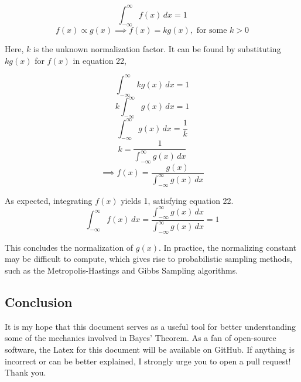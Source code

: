 \documentclass[12pt]{article}
\begin{document}
\begin{equation}
\int_{-\infty}^{\infty} f(x) \, dx = 1
\end{equation}
\begin{equation}
f(x) \propto g(x) \implies f(x) = k g(x), \text{ for some } k > 0
\end{equation}

\noindent Here, $k$ is the unknown normalization factor. It can be found by substituting $kg(x)$ for $f(x)$ in equation 22,

\begin{equation}
\int_{-\infty}^{\infty} kg(x) \, dx = 1
\end{equation}
\begin{equation}
k\int_{-\infty}^{\infty} g(x) \, dx = 1
\end{equation}
\begin{equation}
\int_{-\infty}^{\infty} g(x) \, dx = \frac{1}{k}
\end{equation}
\begin{equation}
k = \frac{1}{\int_{-\infty}^{\infty} g(x) \, dx}
\end{equation}
\begin{equation}
\implies f(x) = \frac{g(x)}{\int_{-\infty}^{\infty} g(x) \, dx}
\end{equation}

\noindent As expected, integrating $f(x)$ yields 1, satisfying equation 22.
\begin{equation}
\int_{-\infty}^{\infty} f(x)\, dx = \frac{\int_{-\infty}^{\infty} g(x) \, dx}{\int_{-\infty}^{\infty} g(x) \, dx} = 1
\end{equation}

\noindent This concludes the normalization of $g(x)$. In practice, the normalizing constant may be difficult to compute, which gives rise to probabilistic sampling methods, such as the Metropolis-Hastings and Gibbs Sampling algorithms.


\subsection*{Conclusion}
\noindent It is my hope that this document serves as a useful tool for better understanding some of the mechanics involved in Bayes' Theorem. As a fan of open-source software, the Latex for this document will be available on GitHub. If anything is incorrect or can be better explained, I strongly urge you to open a pull request! Thank you.
\end{document}
